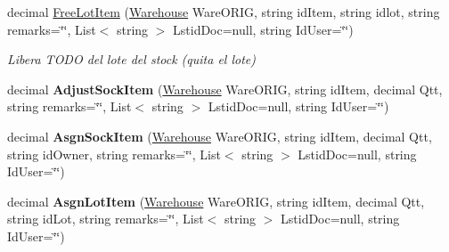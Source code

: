 \begin{DoxyCompactItemize}
decimal \mbox{\hyperlink{class_h_k_supply_1_1_p_r_j___stocks_1_1_classes_1_1_stocks_a419182d036c725d60949c07e201f5825}{Free\+Lot\+Item}} (\mbox{\hyperlink{class_h_k_supply_1_1_p_r_j___stocks_1_1_classes_1_1_stocks_1_1_warehouse}{Warehouse}} Ware\+O\+R\+IG, string id\+Item, string idlot, string remarks=\char`\"{}\char`\"{}, List$<$ string $>$ Lstid\+Doc=null, string Id\+User=\char`\"{}\char`\"{})
\begin{DoxyCompactList}\small\item\em Libera T\+O\+DO del lote del stock (quita el lote) \end{DoxyCompactList}\item 
\mbox{\label{class_h_k_supply_1_1_p_r_j___stocks_1_1_classes_1_1_stocks_a4049cf0a6e6e3ef5f7f9ba5915babaec}} 
decimal {\bfseries Adjust\+Sock\+Item} (\mbox{\hyperlink{class_h_k_supply_1_1_p_r_j___stocks_1_1_classes_1_1_stocks_1_1_warehouse}{Warehouse}} Ware\+O\+R\+IG, string id\+Item, decimal Qtt, string remarks=\char`\"{}\char`\"{}, List$<$ string $>$ Lstid\+Doc=null, string Id\+User=\char`\"{}\char`\"{})
\item 
\mbox{\label{class_h_k_supply_1_1_p_r_j___stocks_1_1_classes_1_1_stocks_a3442f25c6cd2fcc0639ffbc3b1e5cb33}} 
decimal {\bfseries Asgn\+Sock\+Item} (\mbox{\hyperlink{class_h_k_supply_1_1_p_r_j___stocks_1_1_classes_1_1_stocks_1_1_warehouse}{Warehouse}} Ware\+O\+R\+IG, string id\+Item, decimal Qtt, string id\+Owner, string remarks=\char`\"{}\char`\"{}, List$<$ string $>$ Lstid\+Doc=null, string Id\+User=\char`\"{}\char`\"{})
\item 
\mbox{\label{class_h_k_supply_1_1_p_r_j___stocks_1_1_classes_1_1_stocks_a95ea783773bc81bafa55c803ff1e14fa}} 
decimal {\bfseries Asgn\+Lot\+Item} (\mbox{\hyperlink{class_h_k_supply_1_1_p_r_j___stocks_1_1_classes_1_1_stocks_1_1_warehouse}{Warehouse}} Ware\+O\+R\+IG, string id\+Item, decimal Qtt, string id\+Lot, string remarks=\char`\"{}\char`\"{}, List$<$ string $>$ Lstid\+Doc=null, string Id\+User=\char`\"{}\char`\"{})
\item 
\mbox{\label{class_h_k_supply_1_1_p_r_j___stocks_1_1_classes_1_1_stocks_ae118fdaa3b1abf91c2a6ba59be636869}} 

\end{DoxyCompactItemize}
